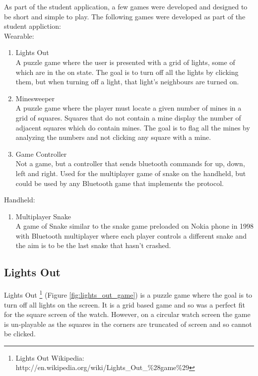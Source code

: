 As part of the student application, a few games were developed and designed to
be short and simple to play. The following games were developed as part of the
student appliction:\\
Wearable:
\begin{enumerate}
\item Lights Out\\
    A puzzle game where the user is presented with a grid of lights, some of
    which are in the on state. The goal is to turn off all the lights by
    clicking them, but when turning off a light, that light's neighbours are
    turned on.
\item Minesweeper\\
    A puzzle game where the player must locate a given number of mines in a
    grid of squares. Squares that do not contain a mine display the number of
    adjacent squares which do contain mines. The goal is to flag all the mines
    by analyzing the numbers and not clicking any square with a mine.
\item Game Controller\\
    Not a game, but a controller that sends bluetooth commands for up, down,
    left and right. Used for the multiplayer game of snake on the handheld, but
    could be used by any Bluetooth game that implements the protocol.
\end{enumerate}

Handheld:
\begin{enumerate}
\item Multiplayer Snake\\
    A game of Snake similar to the snake game preloaded on Nokia phone in 1998
    with Bluetooth multiplayer where each player controls a different snake and
    the aim is to be the last snake that hasn't crashed.
\end{enumerate}


\subsection{Lights Out}

Lights Out
\footnote{Lights Out Wikipedia: http://en.wikipedia.org/wiki/Lights\_Out\_\%28game\%29}
(Figure \ref{fig:lights_out_game})
is a puzzle game where the goal is to turn off all lights on the screen. It is
a grid based game and so was a perfect fit for the square screen of the watch.
However, on a circular watch screen the game is un-playable as the squares in
the corners are truncated of screen and so cannot be clicked.

